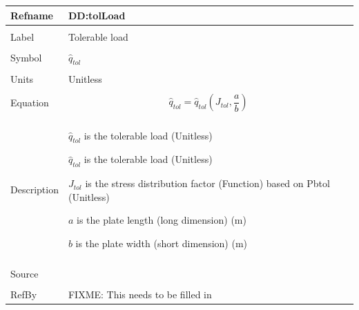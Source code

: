 \documentclass[12pt]{article}
\begin{document}
\noindent \begin{minipage}{\textwidth}
\begin{tabular}{p{} p{}}
\toprule \textbf{Refname} & \textbf{DD:tolLoad}
\label{DD:tolLoad}
\\ \midrule \\
Label & Tolerable load
\\ \midrule \\
Symbol & ${\hat{q}_{tol}}$
\\ \midrule \\
Units & Unitless
\\ \midrule \\
Equation & \begin{dmath}
           {\hat{q}_{tol}}={\hat{q}_{tol}}\left({J_{tol}},\frac{a}{b}\right)
           \end{dmath}
\\ \midrule \\
Description & \begin{symbDescription}
              \item{${\hat{q}_{tol}}$ is the tolerable load (Unitless)}
              \item{${\hat{q}_{tol}}$ is the tolerable load (Unitless)}
              \item{${J_{tol}}$ is the stress distribution factor (Function) based on Pbtol (Unitless)}
              \item{$a$ is the plate length (long dimension) (m)}
              \item{$b$ is the plate width (short dimension) (m)}
              \end{symbDescription}
\\ \midrule \\
Source & 
\\ \midrule \\
RefBy & FIXME: This needs to be filled in
\\ \bottomrule \end{tabular}
\end{minipage}\\
~\newline
\end{document}
